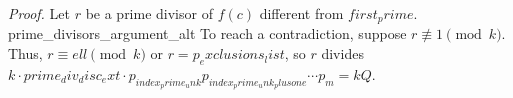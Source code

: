 \textit{Proof.} Let $r$ be a prime divisor of $f(c)$ different from ${first_prime}$. {prime_divisors_argument_alt} To reach a contradiction, suppose $r\not\equiv 1\pmod{{k}}$. Thus, $r\equiv {ell}\pmod{{k}}$ or $r={p_exclusions_list}$, so $r$ divides ${k}\cdot{prime_div_disc_ext}\cdot p_{{index_prime_unk}}p_{{index_prime_unk_plusone}}\cdots p_m={k}Q$.